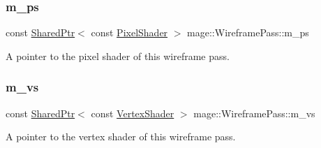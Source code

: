 \subsubsection{\texorpdfstring{m\+\_\+ps}{m\_ps}}
{\footnotesize\ttfamily const \hyperlink{namespacemage_a1e01ae66713838a7a67d30e44c67703e}{Shared\+Ptr}$<$ const \hyperlink{namespacemage_a27ecaf266420ee7a494d64edc0757129}{Pixel\+Shader} $>$ mage\+::\+Wireframe\+Pass\+::m\+\_\+ps\hspace{0.3cm}{\ttfamily [private]}}

A pointer to the pixel shader of this wireframe pass. \hypertarget{classmage_1_1_wireframe_pass_aa55de3b804055362812bcf775e0dffb4}{}\label{classmage_1_1_wireframe_pass_aa55de3b804055362812bcf775e0dffb4} 
\subsubsection{\texorpdfstring{m\+\_\+vs}{m\_vs}}
{\footnotesize\ttfamily const \hyperlink{namespacemage_a1e01ae66713838a7a67d30e44c67703e}{Shared\+Ptr}$<$ const \hyperlink{classmage_1_1_vertex_shader}{Vertex\+Shader} $>$ mage\+::\+Wireframe\+Pass\+::m\+\_\+vs\hspace{0.3cm}{\ttfamily [private]}}

A pointer to the vertex shader of this wireframe pass. 